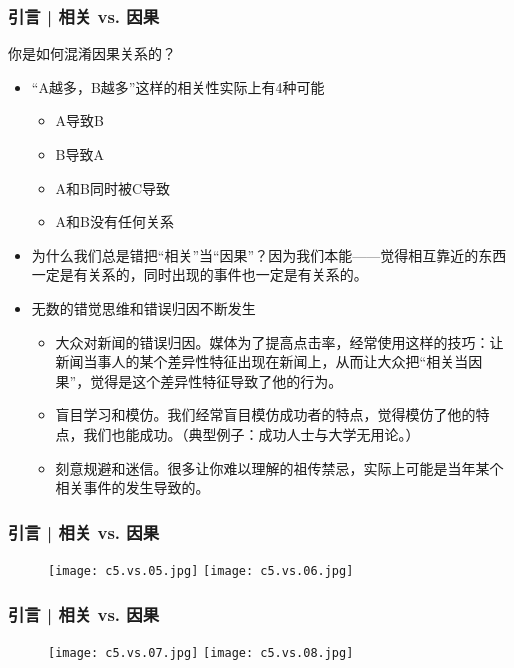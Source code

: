 \begin{frame}
  \frametitle{引言 | 相关 vs. 因果}
  \begin{block}{你是如何混淆因果关系的？}
    \begin{itemize}
      \item “A越多，B越多”这样的相关性实际上有4种可能
        \begin{itemize}
          \item A导致B
          \item B导致A
          \item A和B同时被C导致
          \item A和B没有任何关系
        \end{itemize}
      \item 为什么我们总是错把“相关”当“因果”？因为我们本能——觉得相互靠近的东西一定是有关系的，同时出现的事件也一定是有关系的。
      \item 无数的错觉思维和错误归因不断发生
        \begin{itemize}
          \item 大众对新闻的错误归因。媒体为了提高点击率，经常使用这样的技巧：让新闻当事人的某个差异性特征出现在新闻上，从而让大众把“相关当因果”，觉得是这个差异性特征导致了他的行为。
          \item 盲目学习和模仿。我们经常盲目模仿成功者的特点，觉得模仿了他的特点，我们也能成功。（典型例子：成功人士与大学无用论。）
          \item 刻意规避和迷信。很多让你难以理解的祖传禁忌，实际上可能是当年某个相关事件的发生导致的。
        \end{itemize}
    \end{itemize}
  \end{block}
\end{frame}

\begin{frame}
  \frametitle{引言 | 相关 vs. 因果}
  \begin{figure}
    \centering
    \texttt{[image: c5.vs.05.jpg]}
    \texttt{[image: c5.vs.06.jpg]}
  \end{figure}
\end{frame}

\begin{frame}
  \frametitle{引言 | 相关 vs. 因果}
  \begin{figure}
    \centering
    \texttt{[image: c5.vs.07.jpg]}
    \texttt{[image: c5.vs.08.jpg]}
  \end{figure}
\end{frame}

